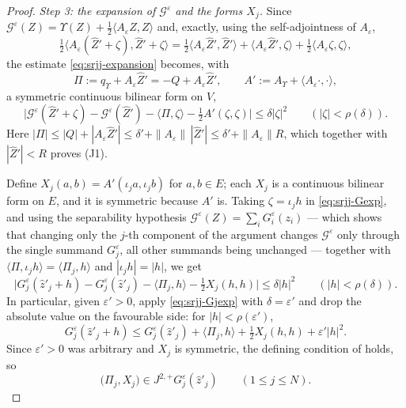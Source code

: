 \begin{proof}
\emph{Step 3: the expansion of $\mathcal G^\varepsilon$ and the forms $X_j$.}
Since $\mathcal G^\varepsilon(Z)=\Upsilon(Z)
+\tfrac12\langle A_\varepsilon Z,Z\rangle$ and, exactly, using the
self-adjointness of $A_\varepsilon$,
\[
  \tfrac12\bigl\langle A_\varepsilon(\widehat Z'+\zeta),
    \widehat Z'+\zeta\bigr\rangle
   =\tfrac12\langle A_\varepsilon\widehat Z',\widehat Z'\rangle
     +\langle A_\varepsilon\widehat Z',\zeta\rangle
     +\tfrac12\langle A_\varepsilon\zeta,\zeta\rangle,
\]
the estimate \eqref{eq:srjj-expansion} becomes, with
\[
  \Pi:=q_\Upsilon+A_\varepsilon\widehat Z'=-Q+A_\varepsilon\widehat Z',
  \qquad
  A':=A_\Upsilon+\langle A_\varepsilon\cdot,\cdot\rangle,
\]
a symmetric continuous bilinear form on $V$,
\begin{equation}\label{eq:srjj-Gexp}
  \bigl|\mathcal G^\varepsilon(\widehat Z'+\zeta)
    -\mathcal G^\varepsilon(\widehat Z')-\langle\Pi,\zeta\rangle
    -\tfrac12A'(\zeta,\zeta)\bigr|\le\delta|\zeta|^2
  \qquad(|\zeta|<\rho(\delta)).
\end{equation}
Here $|\Pi|\le|Q|+|A_\varepsilon\widehat Z'|
\le\delta'+\|A_\varepsilon\|\,|\widehat Z'|\le\delta'+\|A_\varepsilon\|R$, which
together with $|\widehat Z'|<R$ proves (J1).

Define $X_j(a,b)=A'(\iota_ja,\iota_jb)$ for $a,b\in E$; each $X_j$ is a
continuous bilinear form on $E$, and it is symmetric because $A'$ is. Taking
$\zeta=\iota_jh$ in \eqref{eq:srjj-Gexp}, and using the separability hypothesis
$\mathcal G^\varepsilon(Z)=\sum_iG_i^\varepsilon(z_i)$ --- which shows that
changing only the $j$-th component of the argument changes
$\mathcal G^\varepsilon$ only through the single summand $G_j^\varepsilon$, all
other summands being unchanged --- together with
$\langle\Pi,\iota_jh\rangle=\langle\Pi_j,h\rangle$ and $|\iota_jh|=|h|$, we get
\begin{equation}\label{eq:srjj-Gjexp}
  \bigl|G_j^\varepsilon(\widehat z'_j+h)-G_j^\varepsilon(\widehat z'_j)
   -\langle\Pi_j,h\rangle-\tfrac12X_j(h,h)\bigr|\le\delta|h|^2
  \qquad(|h|<\rho(\delta)).
\end{equation}
In particular, given $\varepsilon'>0$, apply \eqref{eq:srjj-Gjexp} with
$\delta=\varepsilon'$ and drop the absolute value on the favourable side: for
$|h|<\rho(\varepsilon')$,
\[
  G_j^\varepsilon(\widehat z'_j+h)\le G_j^\varepsilon(\widehat z'_j)
    +\langle\Pi_j,h\rangle+\tfrac12X_j(h,h)+\varepsilon'|h|^2 .
\]
Since $\varepsilon'>0$ was arbitrary and $X_j$ is symmetric, the defining
condition of  holds, so
\begin{equation}\label{eq:srjj-jet}
  \bigl(\Pi_j,X_j\bigr)\in J^{2,+}G_j^\varepsilon(\widehat z'_j)
  \qquad(1\le j\le N).
\end{equation}


\end{proof}

